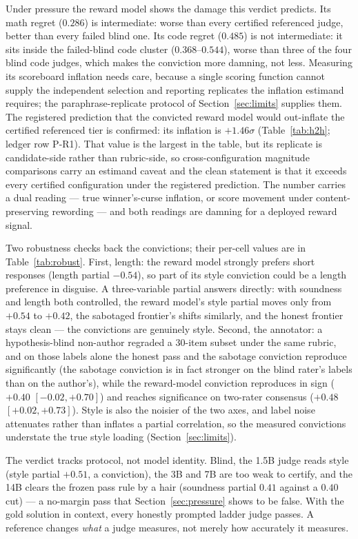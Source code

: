 Under pressure the reward model shows the damage this verdict predicts.
Its math regret ($0.286$) is intermediate: worse than every certified referenced judge, better than every failed blind one.
Its code regret ($0.485$) is not intermediate: it sits inside the failed-blind code cluster ($0.368$--$0.544$), worse than three of the four blind code judges, which makes the conviction more damning, not less.
Measuring its scoreboard inflation needs care, because a single scoring function cannot supply the independent selection and reporting replicates the inflation estimand requires; the paraphrase-replicate protocol of Section~\ref{sec:limits} supplies them.
The registered prediction that the convicted reward model would out-inflate the certified referenced tier is confirmed: its inflation is $+1.46\sigma$ (Table~\ref{tab:h2h}; ledger row P-R1).
That value is the largest in the table, but its replicate is candidate-side rather than rubric-side, so cross-configuration magnitude comparisons carry an estimand caveat and the clean statement is that it exceeds every certified configuration under the registered prediction.
The number carries a dual reading --- true winner's-curse inflation, or score movement under content-preserving rewording --- and both readings are damning for a deployed reward signal.

Two robustness checks back the convictions; their per-cell values are in Table~\ref{tab:robust}.
First, length: the reward model strongly prefers short responses (length partial $-0.54$), so part of its style conviction could be a length preference in disguise.
A three-variable partial answers directly: with soundness and length both controlled, the reward model's style partial moves only from $+0.54$ to $+0.42$, the sabotaged frontier's shifts similarly, and the honest frontier stays clean --- the convictions are genuinely style.
Second, the annotator: a hypothesis-blind non-author regraded a 30-item subset under the same rubric, and on those labels alone the honest pass and the sabotage conviction reproduce significantly (the sabotage conviction is in fact stronger on the blind rater's labels than on the author's), while the reward-model conviction reproduces in sign ($+0.40$ $[-0.02, +0.70]$) and reaches significance on two-rater consensus ($+0.48$ $[+0.02, +0.73]$).
Style is also the noisier of the two axes, and label noise attenuates rather than inflates a partial correlation, so the measured convictions understate the true style loading (Section~\ref{sec:limits}).

The verdict tracks protocol, not model identity.
Blind, the 1.5B judge reads style (style partial $+0.51$, a conviction), the 3B and 7B are too weak to certify, and the 14B clears the frozen pass rule by a hair (soundness partial $0.41$ against a $0.40$ cut) --- a no-margin pass that Section~\ref{sec:pressure} shows to be false.
With the gold solution in context, every honestly prompted ladder judge passes.
A reference changes \emph{what} a judge measures, not merely how accurately it measures.

